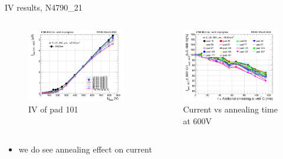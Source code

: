 \documentclass{beamer}
\begin{document}
\begin{frame}{IV results, N4790\_21}
   \begin{columns}
        \begin{figure}
            \includegraphics[width=1.0\textwidth]{plots/annealing_IV_ch101_N4790_21.png}
            \caption{IV of pad 101}
        \end{figure}

        \begin{figure}
            \includegraphics[width=1.0\textwidth]{plots/annealing_current_N4790_21.png}
            \caption{Current vs annealing time at 600V}
        \end{figure}
    \end{columns}
    \begin{itemize}
        \item we do see annealing effect on current
    \end{itemize}
\end{frame}
\end{document}
